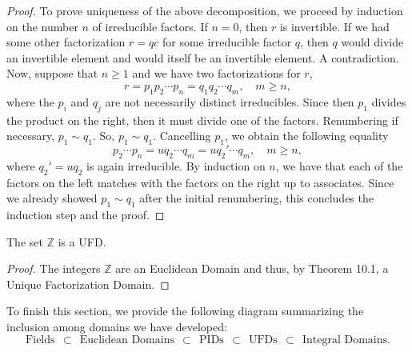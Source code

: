 \documentclass[11pt,a4paper]{article}
\begin{document}
\begin{proof}
    To prove uniqueness of the above decomposition, we proceed by induction on the number $n$ of irreducible factors. If $n = 0$, then $r$ is invertible. If we had some other factorization $r = qc$ for some irreducible factor $q$, then $q$ would divide an invertible element and would itself be an invertible element. A contradiction. Now, suppose that $n \geq 1$ and we have two factorizations for $r$,
    \[
    r = p_1 p_2 \cdots p_n = q_1 q_2 \cdots q_m, \quad m \geq n,
    \]
    where the $p_i$ and $q_j$ are not necessarily distinct irreducibles. Since then $p_1$ divides the product on the right, then it must divide one of the factors. Renumbering if necessary, $p_1 \sim q_1$. So, $p_1 \sim q_1$. Cancelling $p_1$, we obtain the following equality
    \[
    p_2 \cdots p_n = uq_2 \cdots q_m = uq_2' \cdots q_m, \quad m \geq n,
    \]
    where $q_2' = uq_2$ is again irreducible. By induction on $n$, we have that each of the factors on the left matches with the factors on the right up to associates. Since we already showed $p_1 \sim q_1$ after the initial renumbering, this concludes the induction step and the proof.
    \end{proof}
    
    \begin{cor}
    The set $\mathbb{Z}$ is a UFD.
    \end{cor}
    
    \begin{proof}
    The integers $\mathbb{Z}$ are an Euclidean Domain and thus, by Theorem 10.1, a Unique Factorization Domain.
    \end{proof}
    
    To finish this section, we provide the following diagram summarizing the inclusion among domains we have developed:
    \[
    \text{Fields}\;\, \subset\;\, \text{Euclidean Domains} \;\,\subset\;\, \text{PIDs} \;\,\subset\;\, \text{UFDs} \;\,\subset\;\, \text{Integral Domains}.
    \]
    
\end{document}
